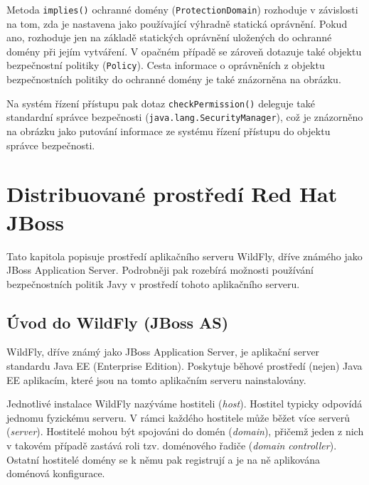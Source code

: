 Metoda {\tt implies()} ochranné domény ({\tt ProtectionDomain}) rozhoduje v závislosti na tom, zda je nastavena jako používající výhradně statická oprávnění.
Pokud ano, rozhoduje jen na základě statických oprávnění uložených do ochranné domény při jejím vytváření.
V opačném případě se zároveň dotazuje také objektu bezpečnostní politiky ({\tt Policy}).
Cesta informace o oprávněních z objektu bezpečnostních politiky do ochranné domény je také znázorněna na obrázku.

Na systém řízení přístupu pak dotaz {\tt checkPermission()} deleguje také standardní správce bezpečnosti ({\tt java.lang.SecurityManager}), což je znázorněno na obrázku jako putování informace ze systému řízení přístupu do objektu správce bezpečnosti.


\chapter{Distribuované prostředí Red Hat JBoss} \label{jboss}

Tato kapitola popisuje prostředí aplikačního serveru WildFly, dříve známého jako JBoss Application Server.
Podrobněji pak rozebírá možnosti používání bezpečnostních politik Javy v prostředí tohoto aplikačního serveru.

\section{Úvod do WildFly (JBoss AS)} \label{uvodWildFly}

WildFly, dříve známý jako JBoss Application Server, je aplikační server standardu Java EE (Enterprise Edition).
Poskytuje běhové prostředí (nejen) Java EE aplikacím, které jsou na tomto aplikačním serveru nainstalovány.
\cite{wildflyRename}

Jednotlivé instalace WildFly nazýváme hostiteli ({\it host}). Hostitel typicky odpovídá jednomu fyzickému serveru.
V rámci každého hostitele může běžet více serverů ({\it server}).
Hostitelé mohou být spojováni do domén ({\it domain}), přičemž jeden z nich v takovém případě zastává roli tzv. doménového řadiče ({\it domain controller}).
Ostatní hostitelé domény se k němu pak registrují a je na ně aplikována doménová konfigurace.
\cite{jbossDomainSetup}

